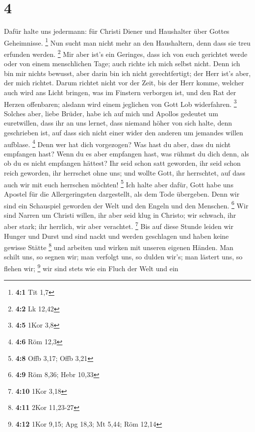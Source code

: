 \hypertarget{section-3}{%
\section{4}\label{section-3}}

 Dafür halte uns jedermann: für Christi Diener und
Haushalter über Gottes Geheimnisse. \footnote{\textbf{4:1} Tit 1,7}
 Nun sucht man nicht mehr an den Haushaltern, denn dass
sie treu erfunden werden. \footnote{\textbf{4:2} Lk 12,42}
 Mir aber ist's ein Geringes, dass ich von euch gerichtet
werde oder von einem menschlichen Tage; auch richte ich mich selbst
nicht.  Denn ich bin mir nichts bewusst, aber darin bin
ich nicht gerechtfertigt; der Herr ist's aber, der mich richtet.
 Darum richtet nicht vor der Zeit, bis der Herr komme,
welcher auch wird ans Licht bringen, was im Finstern verborgen ist, und
den Rat der Herzen offenbaren; alsdann wird einem jeglichen von Gott Lob
widerfahren. \footnote{\textbf{4:5} 1Kor 3,8}  Solches
aber, liebe Brüder, habe ich auf mich und Apollos gedeutet um
euretwillen, dass ihr an uns lernet, dass niemand höher von sich halte,
denn geschrieben ist, auf dass sich nicht einer wider den anderen um
jemandes willen aufblase. \footnote{\textbf{4:6} Röm 12,3}
 Denn wer hat dich vorgezogen? Was hast du aber, dass du
nicht empfangen hast? Wenn du es aber empfangen hast, was rühmst du dich
denn, als ob du es nicht empfangen hättest?  Ihr seid
schon satt geworden, ihr seid schon reich geworden, ihr herrschet ohne
uns; und wollte Gott, ihr herrschtet, auf dass auch wir mit euch
herrschen möchten! \footnote{\textbf{4:8} Offb 3,17; Offb 3,21}
 Ich halte aber dafür, Gott habe uns Apostel für die
Allergeringsten dargestellt, als dem Tode übergeben. Denn wir sind ein
Schauspiel geworden der Welt und den Engeln und den Menschen.
\footnote{\textbf{4:9} Röm 8,36; Hebr 10,33}  Wir sind
Narren um Christi willen, ihr aber seid klug in Christo; wir schwach,
ihr aber stark; ihr herrlich, wir aber verachtet. \footnote{\textbf{4:10}
  1Kor 3,18}  Bis auf diese Stunde leiden wir Hunger und
Durst und sind nackt und werden geschlagen und haben keine gewisse
Stätte \footnote{\textbf{4:11} 2Kor 11,23-27}  und
arbeiten und wirken mit unseren eigenen Händen. Man schilt uns, so
segnen wir; man verfolgt uns, so dulden wir's; man lästert uns, so
flehen wir; \footnote{\textbf{4:12} 1Kor 9,15; Apg 18,3; Mt 5,44; Röm
  12,14}  wir sind stets wie ein Fluch der Welt und ein
